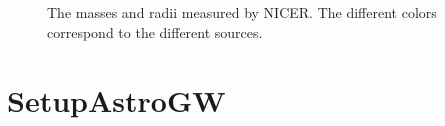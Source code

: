 \documentclass[letterpaper,10pt,english]{sphinxmanual}
\begin{document}
\begin{figure}[htbp]
\centering
\capstart

\noindent{}
\caption{The masses and radii measured by NICER. The different colors correspond to the different sources.}\label{\detokenize{source/api/setup_astro_mr:id1}}\end{figure}

\sphinxstepscope


\section{SetupAstroGW}
\label{\detokenize{source/api/setup_astro_gw:setupastrogw}}\label{\detokenize{source/api/setup_astro_gw::doc}}\label{\detokenize{source/api/setup_astro_gw:module-nucleardatapy.setup_astro_gw}}
\end{document}
